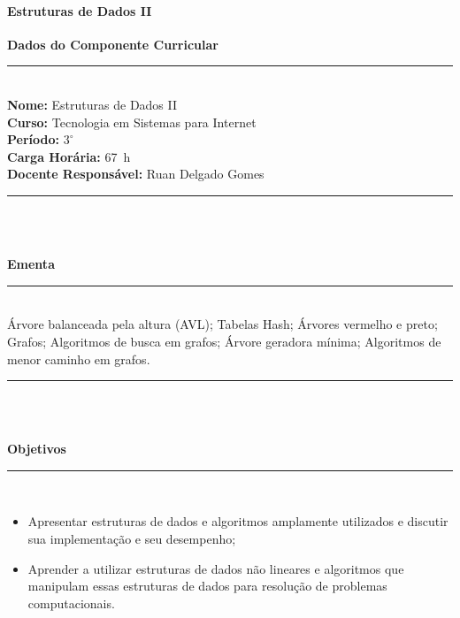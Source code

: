 \paragraph{Estruturas de Dados II}

\begin{center}\textbf{Dados do Componente Curricular}\end{center}
\vspace{-5mm}
\noindent\rule{16.5cm}{0.4pt}
\\
\textbf{Nome:} Estruturas de Dados II
\\ 
\textbf{Curso:} Tecnologia em Sistemas para Internet
\\ 
\textbf{Período:} $3^{\circ}$
\\ 
\textbf{Carga Horária:} 67~h
\\ 
\textbf{Docente Responsável:} Ruan Delgado Gomes
\\ 
\noindent\rule{16.5cm}{0.4pt}\\
\\
\vspace{-12mm}
\begin{center}\textbf{Ementa}\end{center}
\vspace{-5mm}
\noindent\rule{16.5cm}{0.4pt}
\\
\'Arvore balanceada pela altura (AVL); Tabelas Hash; \'Arvores vermelho e preto; Grafos; Algoritmos de busca em grafos; \'Arvore geradora m\'inima; Algoritmos de menor caminho em grafos.\\ 
\noindent\rule{16.5cm}{0.4pt}\\
\\
\vspace{-12mm}
\begin{center}\textbf{Objetivos}\end{center}
\vspace{-5mm}
\noindent\rule{16.5cm}{0.4pt}
\\
\begin{itemize}
\item Apresentar estruturas de dados e algoritmos amplamente utilizados e discutir sua implementação e seu desempenho;
\item Aprender a utilizar estruturas de dados n\~ao lineares e algoritmos que manipulam essas estruturas de dados para resolu\c{c}\~ao de problemas computacionais.
\end{itemize} 
